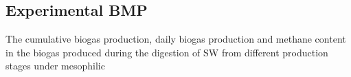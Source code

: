 \subsection{Experimental BMP}
The cumulative biogas production, daily biogas production and methane content in the biogas produced during the digestion of SW from different production stages under mesophilic 